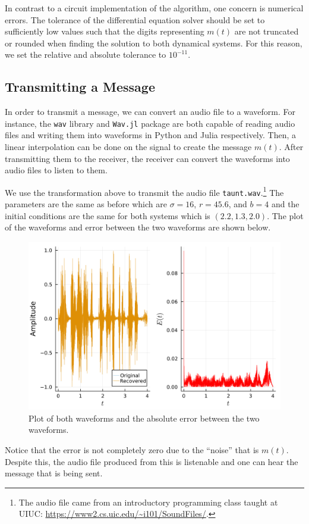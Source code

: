 \documentclass[12pt]{article}
\begin{document}
    In contrast to a circuit implementation of the algorithm, one concern is numerical errors. The tolerance of the differential equation solver should be set to sufficiently low values such that the digits representing $m(t)$ are not truncated or rounded when finding the solution to both dynamical systems. For this reason, we set the relative and absolute tolerance to $10^{-11}$. 
    \subsection{Transmitting a Message}
    In order to transmit a message, we can convert an audio file to a waveform. For instance, the \verb|wav| library and \verb|Wav.jl| package are both capable of reading audio files and writing them into waveforms in Python and Julia respectively. Then, a linear interpolation can be done on the signal to create the message $m(t)$. After transmitting them to the receiver, the receiver can convert the waveforms into audio files to listen to them. 
    
    We use the transformation above to transmit the audio file \verb|taunt.wav|.\footnote{The audio file came from an introductory programming class taught at UIUC: \url{https://www2.cs.uic.edu/~i101/SoundFiles/}.} The parameters are the same as before which are $\sigma = 16$, $r=45.6$, and $b = 4$ and the initial conditions are the same for both systems which is $(2.2, 1.3, 2.0)$. The plot of the waveforms and error between the two waveforms are shown below. 
    \begin{figure}[H]
        \includegraphics[width=\linewidth]{combined_error_sound_plot_paper.png}
        \centering
        \caption{Plot of both waveforms and the absolute error between the two waveforms.}
    \end{figure}
    Notice that the error is not completely zero due to the ``noise'' that is $m(t)$. Despite this, the audio file produced from this is listenable and one can hear the message that is being sent. 
\end{document}
